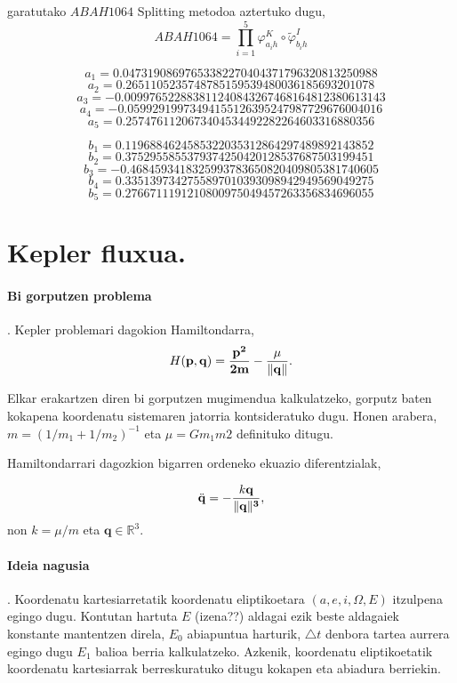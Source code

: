 \begin{enumerate}
garatutako $ABAH1064$ Splitting metodoa aztertuko dugu,
\[ABAH1064=\prod\limits_{i=1}^{5} \varphi_{a_ih}^K \circ \tilde{\varphi}_{b_ih}^I\]

\[a_1=0.04731908697653382270404371796320813250988\]
\[a_2=0.2651105235748785159539480036185693201078\]
\[a_3=-0.009976522883811240843267468164812380613143\]
\[a_4=-0.05992919973494155126395247987729676004016\]
\[a_5=0.2574761120673404534492282264603316880356\]

\[b_1=0.1196884624585322035312864297489892143852\]
\[b_2=0.3752955855379374250420128537687503199451\]
\[b_3=-0.4684593418325993783650820409805381740605\]
\[b_4=0.3351397342755897010393098942949569049275\]
\[b_5=0.2766711191210800975049457263356834696055\]


\end{enumerate} 


\section{Kepler fluxua.}

\paragraph*{\textbf{Bi gorputzen problema}}. Kepler problemari dagokion Hamiltondarra,
\begin{equation}
H(\bf{p},\bf{q})=\frac{\mathbf{p}^2}{2m}-\frac{\mu}{\|\mathbf{q}\|}.
\end{equation}

Elkar erakartzen diren bi gorputzen mugimendua kalkulatzeko, gorputz baten kokapena koordenatu sistemaren jatorria kontsideratuko dugu. Honen arabera, $m=(1/m_1+1/m_2)^{-1}$ eta $\mu=Gm_1m2$ definituko ditugu. 


Hamiltondarrari dagozkion bigarren ordeneko ekuazio diferentzialak,

\begin{equation}
\ddot{\mathbf{q}}= - \frac{k\mathbf{q}}{\|\bf{q}\|^3} ,
\end{equation}
non $k= \mu / m$ eta  $\mathbf{q}\in \mathbb{R}^3$.


\paragraph*{\textbf{Ideia nagusia}}. Koordenatu kartesiarretatik koordenatu eliptikoetara $(a,e,i,\Omega,E)$ itzulpena egingo dugu. Kontutan hartuta $E$ (izena??) aldagai ezik beste aldagaiek konstante mantentzen direla, $E_0$ abiapuntua harturik, $\triangle t$ denbora tartea aurrera egingo dugu $E_1$ balioa berria kalkulatzeko. Azkenik, koordenatu eliptikoetatik koordenatu kartesiarrak berreskuratuko ditugu kokapen eta abiadura berriekin. 

